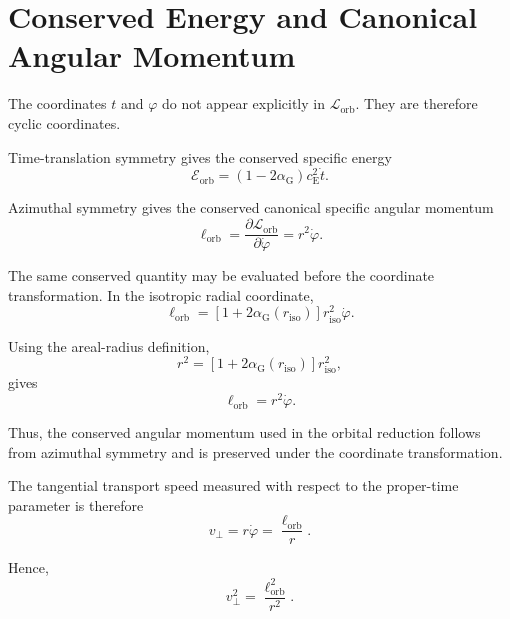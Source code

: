 \section{Conserved Energy and Canonical Angular Momentum}

The coordinates $t$ and $\varphi$ do not appear explicitly in $\mathcal{L}_{\mathrm{orb}}$. They are therefore cyclic coordinates.

Time-translation symmetry gives the conserved specific energy
\begin{equation}
    \boxed{ \mathcal{E}_{\mathrm{orb}} = \left( 1-2\alpha_{\mathrm{G}} \right) c_{\mathrm{E}}^2\dot{t} }.
\end{equation}

Azimuthal symmetry gives the conserved canonical specific angular momentum
\begin{equation}
    \boxed{ \ell_{\mathrm{orb}} = \frac{\partial\mathcal{L}_{\mathrm{orb}}}{\partial\dot{\varphi}} = r^2\dot{\varphi} }.
\end{equation}

The same conserved quantity may be evaluated before the coordinate transformation. In the isotropic radial coordinate,
\begin{equation}
    \ell_{\mathrm{orb}} = \left[ 1+2\alpha_{\mathrm{G}}(r_{\mathrm{iso}}) \right] r_{\mathrm{iso}}^2\dot{\varphi}.
\end{equation}

Using the areal-radius definition,
\begin{equation}
    r^2 = \left[ 1+2\alpha_{\mathrm{G}}(r_{\mathrm{iso}}) \right] r_{\mathrm{iso}}^2,
\end{equation}
gives
\begin{equation}
    \ell_{\mathrm{orb}} = r^2\dot{\varphi}.
\end{equation}

Thus, the conserved angular momentum used in the orbital reduction follows from azimuthal symmetry and is preserved under the coordinate transformation.

The tangential transport speed measured with respect to the proper-time parameter is therefore
\begin{equation}
    v_\perp = r\dot{\varphi} = \frac{\ell_{\mathrm{orb}}}{r}.
\end{equation}

Hence,
\begin{equation}
    v_\perp^2 = \frac{\ell_{\mathrm{orb}}^2}{r^2}.
\end{equation}

